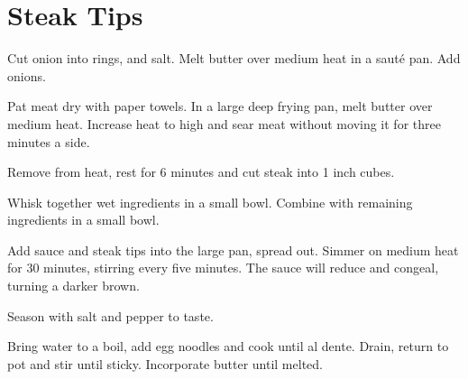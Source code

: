 

\section{Steak Tips}
\begin{recipe}



Cut onion into rings, and salt. Melt butter over medium heat in a sauté pan. Add onions.


Pat meat dry with paper towels. In a large deep frying pan, melt butter over medium heat. Increase heat to high and sear meat without moving it for three minutes a side.

Remove from heat, rest for 6 minutes and cut steak into 1 inch cubes.

\columnbreak


Whisk together wet ingredients in a small bowl. Combine with remaining ingredients in a small bowl.

Add sauce and steak tips into the large pan, spread out. Simmer on medium heat for 30 minutes, stirring every five minutes. The sauce will reduce and congeal, turning a darker brown.

Season with salt and pepper to taste.


Bring water to a boil, add egg noodles and cook until al dente. Drain, return to pot and stir until sticky. Incorporate butter until melted.


\end{recipe}
